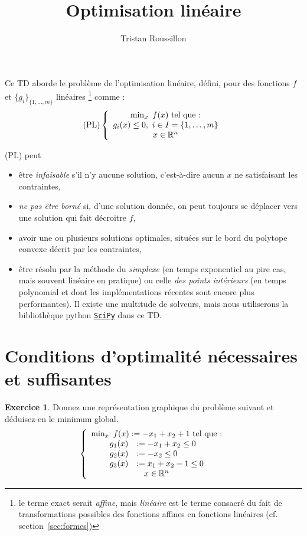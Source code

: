 \documentclass[a4paper,francais]{article}
\title{Optimisation linéaire}
\author{Tristan Roussillon}
\newcommand{\R}{{\ensuremath\mathbb{R}}}
\theoremstyle{definition}
\newtheorem{exercice}{Exercice}[section]
\begin{document}
\maketitle

Ce TD aborde le problème de l'optimisation linéaire, défini,
pour des fonctions $f$ et $\{g_i\}_{\{1, \dots, m\}}$ linéaires
\footnote{le terme exact serait \emph{affine}, mais \emph{linéaire}
  est le terme consacré du fait de transformations possibles des
  fonctions affines en fonctions linéaires (cf. section~\ref{sec:formes})}
comme :
\[
\text{(PL)} \left\{
\begin{array}{c}
  \min_x \ f(x) \ \text{tel que :} \\
  g_i(x) \leq 0, \ i \in I = \{1, \dots, m\} \\
  x \in \R^n \\
\end{array}
\right.
\]

(PL) peut
\begin{itemize}
\item être \emph{infaisable} s'il n'y aucune solution,
  c'est-à-dire aucun $x$ ne satisfaisant les contraintes,
\item \emph{ne pas être borné} si, d'une solution donnée, on peut
  toujours se déplacer vers une solution qui fait décroitre $f$,
\item avoir une ou plusieurs solutions optimales, situées
  sur le bord du polytope convexe décrit par les contraintes,
\item être résolu par la méthode du \emph{simplexe}
  (en temps exponentiel au pire cas, mais souvent linéaire en
  pratique) ou celle \emph{des points intérieurs} (en temps
  polynomial et dont les implémentations récentes sont encore
  plus performantes). Il existe une multitude de solveurs,
  mais nous utiliserons la bibliothèque python
  \href{https://docs.scipy.org/doc/}{\texttt{SciPy}} dans
  ce TD.
\end{itemize} 

\section{Conditions d'optimalité nécessaires et suffisantes}
\label{sec:conditions}

\begin{exercice}
  \label{ex:ex}
  Donnez une représentation graphique du problème suivant
  et déduisez-en le minimum global.
  \[
\left\{
\begin{array}{c}
  \min_x \ f(x) := -x_1 + x_2 + 1 \ \text{tel que :} \\
  \begin{array}{ll}
    g_1(x) &:= -x_1 + x_2 \leq 0 \\
    g_2(x) &:= -x_2 \leq 0 \\
    g_3(x) &:= x_1 + x_2 - 1 \leq 0 \\
  \end{array} \\
  x \in \R^n \\
\end{array}
\right.
\]
\end{exercice}
\end{document}
